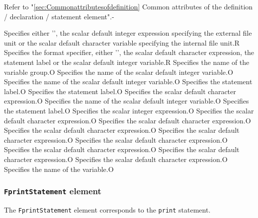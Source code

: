 \begin{XcodeMLAttributes}
{Refer to "\ref{sec:Commonattributesofdefinition} Common attributes of the definition / declaration / statement element".}{-}
\end{XcodeMLAttributes}

\begin{XcodeMLControlList}
{Specifies either '{\tt *}', the scalar default integer expression specifying the external file unit or the scalar default character variable specifying the internal file unit.}{R}
{Specifies the format specifier, either '{\tt *}', the scalar default character expression, the statement label or the scalar default integer variable.}{R}
{Specifies the name of the variable group.}{O}
{Specifies the name of the scalar default integer variable.}{O}
{Specifies the name of the scalar default integer variable.}{O}
{Specifies the statement label.}{O}
{Specifies the statement label.}{O}
{Specifies the scalar default character expression.}{O}
{Specifies the name of the scalar default integer variable.}{O}
{Specifies the statement label.}{O}
{Specifies the scalar integer expression.}{O}
{Specifies the scalar default character expression.}{O}
{Specifies the scalar default character expression.}{O}
{Specifies the scalar default character expression.}{O}
{Specifies the scalar default character expression.}{O}
{Specifies the scalar default character expression.}{O}
{Specifies the scalar default character expression.}{O}
{Specifies the scalar default character expression.}{O}
{Specifies the scalar default character expression.}{O}
{Specifies the name of the variable.}{O}
\end{XcodeMLControlList}


\subsubsection{ {\tt FprintStatement} element}

The {\tt FprintStatement} element corresponds to the {\tt print} statement.

